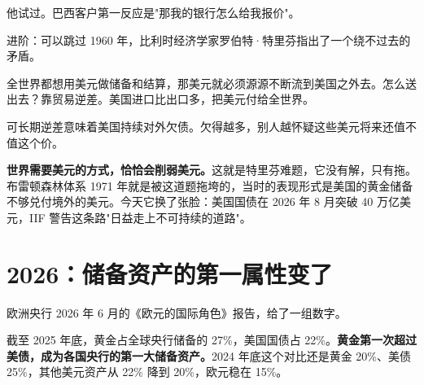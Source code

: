 他试过。巴西客户第一反应是"那我的银行怎么给我报价"。

\begin{flowlist}
\end{flowlist}

\begin{deepbox}{进阶：可以跳过}
1960 年，比利时经济学家罗伯特·特里芬指出了一个绕不过去的矛盾。

全世界都想用美元做储备和结算，那美元就必须源源不断流到美国之外去。怎么送出去？靠贸易逆差。美国进口比出口多，把美元付给全世界。

可长期逆差意味着美国持续对外欠债。欠得越多，别人越怀疑这些美元将来还值不值这个价。

\textbf{世界需要美元的方式，恰恰会削弱美元。}这就是特里芬难题，它没有解，只有拖。布雷顿森林体系 1971 年就是被这道题拖垮的，当时的表现形式是美国的黄金储备不够兑付境外的美元。今天它换了张脸：美国国债在 2026 年 8 月突破 40 万亿美元，IIF 警告这条路"日益走上不可持续的道路"。

\end{deepbox}

\section{2026：储备资产的第一属性变了}

欧洲央行 2026 年 6 月的《欧元的国际角色》报告，给了一组数字。

\begin{barfig}
\end{barfig}

截至 2025 年底，黄金占全球央行储备的 27\%，美国国债占 22\%。\textbf{黄金第一次超过美债，成为各国央行的第一大储备资产。}2024 年底这个对比还是黄金 20\%、美债 25\%，其他美元资产从 22\% 降到 20\%，欧元稳在 15\%。

